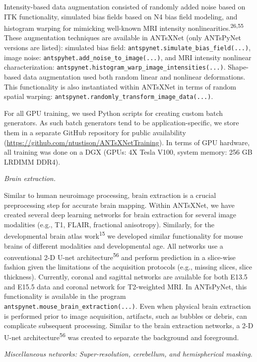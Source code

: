\documentclass[
  12pt,
]{article}
\begin{document}
Intensity-based data augmentation consisted of randomly added noise
based on ITK functionality, simulated bias fields based on N4 bias field
modeling, and histogram warping for mimicking well-known MRI intensity
nonlinearities.\textsuperscript{26,55} These augmentation techniques are
available in ANTsXNet (only ANTsPyNet versions are listed): simulated
bias field: \texttt{antspynet.simulate\_bias\_field(...)}, image noise:
\texttt{antspyhet.add\_noise\_to\_image(...)}, and MRI intensity
nonlinear characterization:
\texttt{antspynet.histogram\_warp\_image\_intensities(...)}. Shape-based
data augmentation used both random linear and nonlinear deformations.
This functionality is also instantiated within ANTsXNet in terms of
random spatial warping:
\texttt{antspynet.randomly\_transform\_image\_data(...)}.

For all GPU training, we used Python scripts for creating custom batch
generators. As such batch generators tend to be application-specific, we
store them in a separate GitHub repository for public availability
(\url{https://github.com/ntustison/ANTsXNetTraining}). In terms of GPU
hardware, all training was done on a DGX (GPUs: 4X Tesla V100, system
memory: 256 GB LRDIMM DDR4).

\emph{Brain extraction.}

Similar to human neuroimage processing, brain extraction is a crucial
preprocessing step for accurate brain mapping. Within ANTsXNet, we have
created several deep learning networks for brain extraction for several
image modalities (e.g., T1, FLAIR, fractional anisotropy). Similarly,
for the developmental brain atlas work\textsuperscript{15} we developed
similar functionality for mouse brains of different modalities and
developmental age. All networks use a conventional 2-D U-net
architecture\textsuperscript{56} and perform prediction in a slice-wise
fashion given the limitations of the acquisition protocols (e.g.,
missing slices, slice thickness). Currently, coronal and sagittal
networks are available for both E13.5 and E15.5 data and coronal network
for T2-weighted MRI. In ANTsPyNet, this functionality is available in
the program \texttt{antspynet.mouse\_brain\_extraction(...)}. Even when
physical brain extraction is performed prior to image acquisition,
artifacts, such as bubbles or debris, can complicate subsequent
processing. Similar to the brain extraction networks, a 2-D U-net
architecture\textsuperscript{56} was created to separate the background
and foreground.

\emph{Miscellaneous networks: Super-resolution, cerebellum, and
hemispherical masking.}
\end{document}
